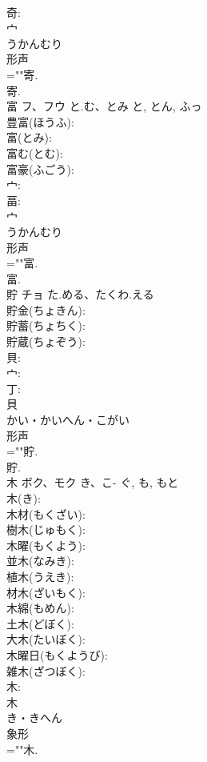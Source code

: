 \documentclass[8pt]{extreport}
\begin{document}
\begin{CJK}{UTF8}{min}
\\	奇: 
\\	宀	
\\	うかんむり	
\\	形声 
\\	=""寄.
\\	寄.
\\	富	フ、フウ	と.む、とみ	と, とん, ふっ	
\\	豊富(ほうふ): 
\\	富(とみ): 
\\	富む(とむ): 
\\	富豪(ふごう): 
\\	宀: 
\\	畐: 
\\	宀	
\\	うかんむり	
\\	形声 
\\	=""富.
\\	富.
\\	貯	チョ	た.める、たくわ.える		
\\	貯金(ちょきん): 
\\	貯蓄(ちょちく): 
\\	貯蔵(ちょぞう): 
\\	貝: 
\\	宀: 
\\	丁: 
\\	貝	
\\	かい・かいへん・こがい	
\\	形声 
\\	=""貯.
\\	貯.
\\	木	ボク、モク	き、こ-	ぐ, も, もと	
\\	木(き): 
\\	木材(もくざい): 
\\	樹木(じゅもく): 
\\	木曜(もくよう): 
\\	並木(なみき): 
\\	植木(うえき): 
\\	材木(ざいもく): 
\\	木綿(もめん): 
\\	土木(どぼく): 
\\	大木(たいぼく): 
\\	木曜日(もくようび): 
\\	雑木(ざつぼく): 
\\	木: 
\\	木	
\\	き・きへん	
\\	象形 
\\	=""木.

\end{CJK}
\end{document}
